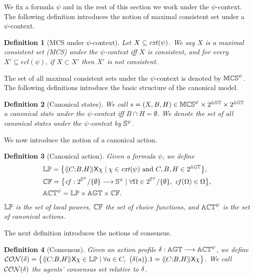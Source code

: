 \documentclass{article}
\newtheorem{definition}{Definition}
\begin{document}
We fix a formula $\psi $ and in the rest of this section
we work  under the  $\psi $-context.  
The following definition introduces the notion of 
maximal consistent set  under a $\psi $-context.

\begin{definition}[MCS under $\psi$-context]\label{def: MCS}
Let $X \subseteq \mathit{cxt}(\psi)$.
  We say $X $  is a maximal  consistent
  set (MCS) under the $\psi $-context iff $X$ is consistent, 
  and for every $X' \subseteq ecl(\psi )$,  if $X\subset X'$ then $X'$ is not consistent. 
\end{definition}
The set of all maximal consistent sets under the $\psi $-context is denoted by $\mathbb{MCS}^\psi $. 
The following definitions introduce the basic structure of the 
canonical model.
\begin{definition}[Canonical states]\label{def: canonical states}
  We call
$s=(X,B,H)\in \mathbb{MCS}^\psi\times 2^{\mathbb{AGT}}\times 2^{\mathbb{AGT}}$ 
a canonical state under the $\psi $-context iff $B\cap H =\emptyset$. 
We denote the set of all canonical states under the $\psi $-context by $\mathbb{S}^{\psi }$.
\end{definition}


We now introduce the notion of a canonical action. 
\begin{definition}[Canonical  action]
Given a formula $\psi $, we define 
\begin{align*}
 &   \LocalPower =
 \big\{\atlbh{\Coalition}{B}{H}\nexttime \chi \mid \chi \in \ecl(\psi) \text{ and }
 C,B,H\in 2^\AGT 
 \big\},\\
&\ChoiceFunction =
\big\{ \choicef: \powerset{\St^{\psi }}/\{\emptyset \}\to \St^{\psi }\mid \forall \Omega \in \powerset{\St^{\psi }}/\{\emptyset \}, \ \choicef(\Omega)  \in \Omega \big\} ,\\
& \ACT^{\psi } = \LocalPower \times \AGT \times \ChoiceFunction.
\end{align*}
$\mathbb{LP} $ is the set of local powers, $\mathbb{CF}$ the set of choice functions, and $\mathbb{ACT}^{\psi }$ is the set of canonical actions.
\end{definition}

The next
definition introduces
the notions of consensus. 
\begin{definition}[Consensus]
Given an action profile $\delta : \mathbb{AGT} \longrightarrow \mathbb{ACT}^{\psi }$,
we define $\mathcal{CON}(\delta) = \big\{\langle\!\langle C{:}B{,}H  \rangle\!\rangle\mathsf{X} \chi \in \mathbb{LP}\mid  \forall a\in C, \ \big(\delta(a) \big).1=\langle\!\langle C{:}B{,}H  \rangle\!\rangle\mathsf{X} \chi \big\}$. We call  $\mathcal{CON}(\delta)$ the  agents' consensus set
relative to  $\delta$.
\end{definition}
\end{document}

